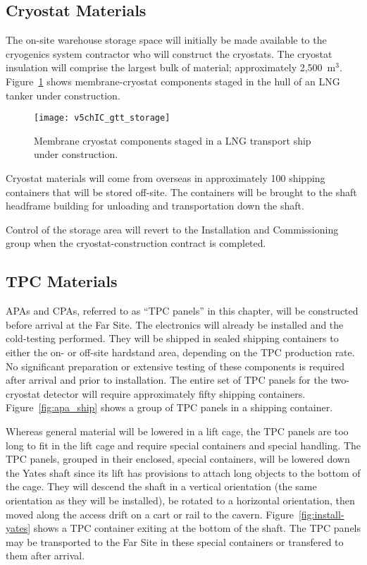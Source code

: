 \subsection{Cryostat Materials}
The on-site warehouse storage space  will initially be made available to the cryogenics system contractor who will construct the cryostats. The cryostat insulation will comprise the largest bulk of material; approximately 2,500~m$^3$. Figure~\ref{fig:gtt_storage} shows membrane-cryostat components staged in the hull of an LNG tanker under construction. 
\begin{figure}[htpb]
\centering
\texttt{[image: v5chIC\_gtt\_storage]}
\caption[Cryostat components staged in a LNG transport ship]{Membrane cryostat components staged in a LNG transport ship under construction.}
\label{fig:gtt_storage}
\end{figure}
Cryostat materials will come from overseas in approximately 100 shipping containers that will be stored off-site. The containers will be brought to the shaft headframe building for unloading and transportation down the shaft.

Control of the storage area will revert to the Installation and Commissioning group when the cryostat-construction contract is completed.

\subsection{TPC Materials}

APAs and CPAs, referred to as ``TPC panels'' in this chapter, will be constructed  before arrival at the Far Site. The electronics will already be installed and the cold-testing performed. They will be shipped in sealed shipping containers to either the on- or off-site hardstand area, depending on the TPC production rate. No significant preparation or extensive testing of these components is required after arrival and prior to installation. The entire set of TPC panels for the two-cryostat detector will require approximately  fifty shipping containers. Figure~\ref{fig:apa_ship} shows a group of TPC panels in a shipping container.


Whereas general material will be lowered in a lift cage, the TPC panels are too long to fit in the lift cage and require special containers and special handling. The TPC panels, grouped in their enclosed, special containers, will be lowered down the Yates shaft since its lift has provisions to attach long objects to the bottom of the cage.
They will descend the shaft in a vertical orientation (the same orientation as they will be installed), be rotated to a horizontal orientation, then moved along the access drift  on a cart or rail to the cavern.
Figure~\ref{fig:install-yates} shows a TPC container exiting at the bottom of the shaft.  The 
TPC panels may be transported to the Far Site in these special containers or transfered to them after arrival.

